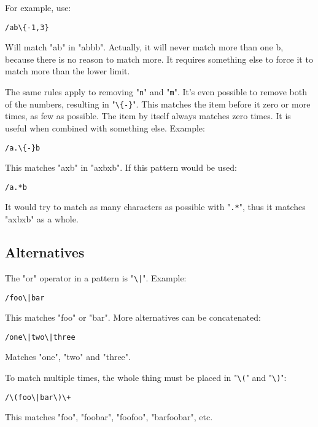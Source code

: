 For example, use:

\begin{Verbatim}[samepage=true]
 /ab\{-1,3}
\end{Verbatim}

Will match "ab" in "abbb".
Actually, it will never match more than one b, because there is no reason to match more.
It requires something else to force it to match more than the lower limit.

The same rules apply to removing "\verb!n!" and "\verb!m!".
It's even possible to remove both of the numbers, resulting in "\verb!\{-}!".
This matches the item before it zero or more times, as few as possible.
The item by itself always matches zero times.
It is useful when combined with something else.
Example:

\begin{Verbatim}[samepage=true]
 /a.\{-}b
\end{Verbatim}

This matches "axb" in "axbxb".
If this pattern would be used:

\begin{Verbatim}[samepage=true]
 /a.*b
\end{Verbatim}

It would try to match as many characters as possible with "\verb!.*!", thus it matches "axbxb" as a whole.
\subsection{Alternatives}
The "or" operator in a pattern is "\verb!\|!".
Example:

\begin{Verbatim}[samepage=true]
 /foo\|bar
\end{Verbatim}

This matches "foo" or "bar".
More alternatives can be concatenated:

\begin{Verbatim}[samepage=true]
 /one\|two\|three
\end{Verbatim}

Matches "one", "two" and "three".

To match multiple times, the whole thing must be placed in "\verb!\(!" and "\verb!\)!":

\begin{Verbatim}[samepage=true]
 /\(foo\|bar\)\+
\end{Verbatim}

This matches "foo", "foobar", "foofoo", "barfoobar", etc.

